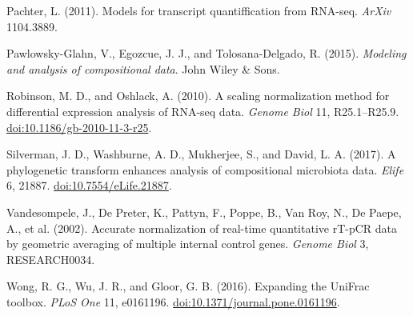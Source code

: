 \documentclass[twocolumn]{article}
\begin{document}
Pachter, L. (2011). Models for transcript quantiffication from RNA-seq.
\emph{ArXiv} 1104.3889.

Pawlowsky-Glahn, V., Egozcue, J. J., and Tolosana-Delgado, R. (2015).
\emph{Modeling and analysis of compositional data}. John Wiley \& Sons.

Robinson, M. D., and Oshlack, A. (2010). A scaling normalization method
for differential expression analysis of RNA-seq data. \emph{Genome Biol}
11, R25.1--R25.9.
\href{http://doi.org/10.1186/gb-2010-11-3-r25}{doi:10.1186/gb-2010-11-3-r25}.

Silverman, J. D., Washburne, A. D., Mukherjee, S., and David, L. A.
(2017). A phylogenetic transform enhances analysis of compositional
microbiota data. \emph{Elife} 6, 21887.
\href{http://doi.org/10.7554/eLife.21887}{doi:10.7554/eLife.21887}.

Vandesompele, J., De Preter, K., Pattyn, F., Poppe, B., Van Roy, N., De
Paepe, A., et al. (2002). Accurate normalization of real-time
quantitative rT-pCR data by geometric averaging of multiple internal
control genes. \emph{Genome Biol} 3, RESEARCH0034.

Wong, R. G., Wu, J. R., and Gloor, G. B. (2016). Expanding the UniFrac
toolbox. \emph{PLoS One} 11, e0161196.
\href{http://doi.org/10.1371/journal.pone.0161196}{doi:10.1371/journal.pone.0161196}.
\end{document}
